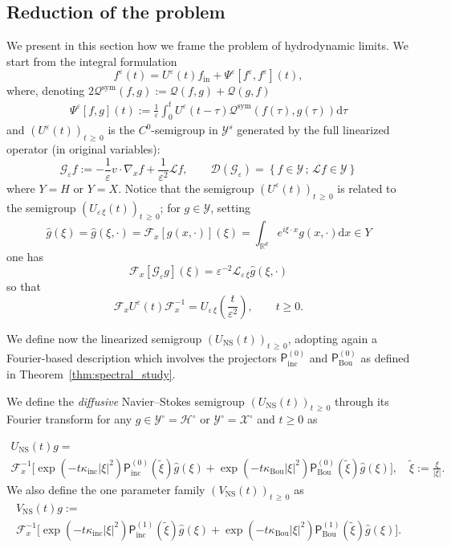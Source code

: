 \documentclass[AHL,Unicode,longabstracts,published]{cedram}
\newcommand{\ini}{\mathrm{in}}
\newcommand{\ns}{\mathrm{NS}}
\newcommand{\sym}{\mathrm{sym}}
\renewcommand{\d}{\mathrm{d}}
\newcommand{\Inc}{\mathrm{inc}}
\newcommand{\Bou}{\mathrm{Bou}}
\newcommand{\R}{\mathbb{R}}
\newcommand{\FF}{\mathcal{F}}
\newcommand{\XX}{\mathcal{X}}
\newcommand{\GG}{\mathcal{G}}
\newcommand{\HH}{\mathcal{H}}
\newcommand{\LL}{\mathcal{L}}
\newcommand{\PP}{\mathsf{P}}
\newcommand{\QQ}{\mathcal{Q}}
\newcommand{\VV}{\mathcal{Y}}
\newcommand{\dom}{\mathscr{D}}
\newcommand{\Ss}{H}
\newcommand{\SSsm}{\HH^{\circ}}
\newcommand{\Sl}{X}
\newcommand{\SSlm}{\XX^{\circ}}
\newcommand{\Sg}{Y}
\newcommand{\SSg}{\VV}
\newcommand{\SSgm}{\VV^{\circ}}
\renewcommand*\ge{\geqslant}
\renewcommand*\geq{\geqslant}
\newcommand*\eps{{\varepsilon}}
\begin{document}
\subsection{Reduction of the problem}\label{scn:reduction_problem}
We present in this section how we frame the problem of hydrodynamic limits. We start from the integral formulation
\begin{equation}\label{eq:Kin-Mild}
f^\eps(t) = U^\eps(t) f_\ini + \Psi^\eps\left[f^\eps, f^\eps \right](t),
\end{equation}
where, denoting $2 \QQ^\sym(f, g) := \QQ(f, g) + \QQ(g, f)$
\begin{gather*}
\Psi^\eps[f,g](t) := \frac{1}{\eps} \int_0^t U^\eps(t - \tau) \QQ^\sym (f(\tau), g(\tau)) \d \tau
\end{gather*}
and $(U^\eps(t))_{t\,\geq\,0}$ is the $C^0$-semigroup in $\SSg^s$ generated by the full linearized operator (in original variables):
\[
\GG_\eps f:=-\frac{1}{\eps} v\cdot \nabla_x f +\frac{1}{\eps^2}\LL f, \qquad \dom(\GG_\eps)=
\left\{f \in \SSg\,;\,\LL f \in \SSg\right\}
\]
where $\Sg=\Ss$ or $\Sg=\Sl.$ Notice that the semigroup $(U^\eps(t))_{t\,\geq\,0}$ is related to the semigroup $(U_{\eps\,\xi}(t))_{t\,\ge\,0}$; for $g \in \SSg$, setting
\[
\widehat{g}(\xi)=\widehat{g}(\xi,\cdot)=\FF_{x}\left[g(x,\cdot)\right](\xi)=\int_{\R^{d}}e^{i\xi\cdot x}g(x,\cdot)\d x \in \Sg
\]
one has
\[
\FF_x\left[\GG_\eps g\right](\xi) = \eps^{-2}\LL_{\eps\,\xi}\widehat{g}(\xi,\cdot)
\]
so that
\[
\FF_x U^\eps(t)\FF_x^{-1}=U_{\eps\,\xi}\left(\frac{t}{\eps^2}\right), \qquad t\ge0.
\]

We define now the linearized semigroup $(U_\ns(t))_{t\,\ge\,0}$, adopting again a Fourier-based description which involves the projectors $\PP^{(0)}_\Inc$ and $\PP_\Bou^{(0)}$ as defined in Theorem~\ref{thm:spectral_study}.


\begin{defi}\label{def:U_NS_V_NS}
We define the \emph{diffusive} Navier--Stokes semigroup $(U_\ns(t))_{t\,\geq\,0}$ through its Fourier transform for any $g \in \SSgm=\SSsm$ or $\SSgm=\SSlm$ and $t \ge 0$ as

\break
\begin{multline*}
U_\ns(t) g =\\
\FF_x^{-1} \Big[ \exp\left(- t \kappa_\Inc | \xi |^2\right) \PP^{(0)}_\Inc \left(\widetilde{\xi} \right) \widehat{g}(\xi) 
 + \exp\left(- t \kappa_\Bou | \xi |^2\right) \PP^{(0)}_\Bou \left(\widetilde{\xi} \right) \widehat{g}(\xi) \Big], \quad \widetilde{\xi} := \frac{\xi}{|\xi|}.
\end{multline*}
We also define the one parameter family $(V_\ns(t))_{t\,\ge \,0}$ as
\begin{multline}\label{eq:defi_V_ns}
V_\ns(t) g :=\\
\FF^{-1}_x\Big[\exp\left(- t \kappa_\Inc | \xi |^2\right) \PP^{(1)}_\Inc\left(\widetilde{\xi} \right) \widehat{g}(\xi) + \exp\left(- t \kappa_\Bou | \xi |^2\right) \PP^{(1)}_\Bou\left(\widetilde{\xi} \right) \widehat{g}(\xi) \Big].
\end{multline}
\end{defi}
\end{document}
